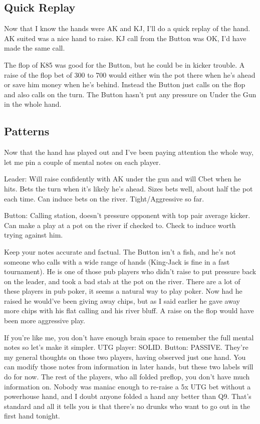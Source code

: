 \subsection*{Quick Replay}

Now that I know the hands were AK and KJ, I'll do a quick replay
of the hand. AK suited was a nice hand to raise. KJ call from the
Button was OK, I'd have made the same call.

The flop of K85 was good for the Button, but he could be in kicker
trouble. A raise of the flop bet of 300 to 700 would either win the
pot there when he's ahead or save him money when he's behind. Instead
the Button just calls on the flop and also calls on the turn. The
Button hasn't put any pressure on Under the Gun in the whole hand.

\subsection*{Patterns}

Now that the hand has played out and I've been paying attention the whole
way, let me pin a couple of mental notes on each player.

Leader: Will raise confidently with AK under the gun and will Cbet when
he hits. Bets the turn when it's likely he's ahead. Sizes bets well, about
half the pot each time. Can induce bets on the river. Tight/Aggressive so far.

Button: Calling station, doesn't pressure opponent with top pair
average kicker. Can make a play at a pot on the river if checked to.
Check to induce worth trying against him.

Keep your notes accurate and factual. The Button isn't a fish,
and he's not someone who calls with a wide range of hands (King-Jack
is fine in a fast tournament). He is one of those
pub players who didn't raise to put pressure back on the leader, and
took a bad stab at the pot on the river. There are a lot of these
players in pub poker, it seems a natural way to play poker. Now had he
raised he would've been giving away chips, but as I said earlier he
gave away more chips with his flat calling and his river bluff. A
raise on the flop would have been more aggressive play.

If you're like me, you don't have enough brain space to remember the
full mental notes so let's make it simpler. UTG player: SOLID.
Button: PASSIVE. They're my general thoughts on those two players,
having observed just one hand. You can modify those notes from
information in later hands, but these two labels will do for now. The
rest of the players, who all folded preflop, you don't have much
information on. Nobody was maniac enough to re-raise a 5x UTG bet
without a powerhouse hand, and I doubt anyone folded a hand any better
than Q9. That's standard and all it tells you is that there's no
drunks who want to go out in the first hand tonight.

